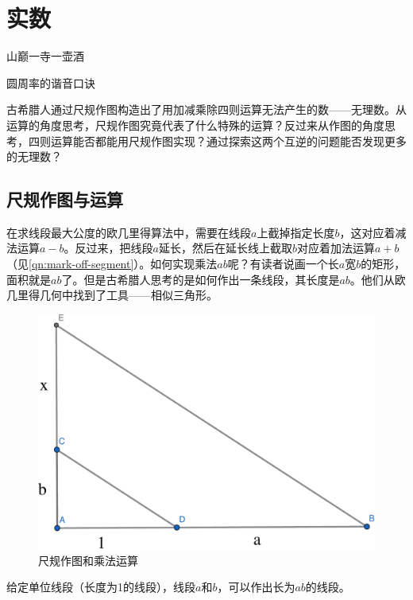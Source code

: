 \documentclass[b5paper]{ctexart}
\begin{document}
\chapter{实数}

\epigraph{山巅一寺一壶酒}{圆周率的谐音口诀}

古希腊人通过尺规作图构造出了用加减乘除四则运算无法产生的数——无理数。从运算的角度思考，尺规作图究竟代表了什么特殊的运算？反过来从作图的角度思考，四则运算能否都能用尺规作图实现？通过探索这两个互逆的问题能否发现更多的无理数？

\section{尺规作图与运算}
\label{sec:geometric-arthimetic}
在求线段最大公度的欧几里得算法中，需要在线段$a$上截掉指定长度$b$，这对应着减法运算$a - b$。反过来，把线段$a$延长，然后在延长线上截取$b$对应着加法运算$a + b$（见\cref{qn:mark-off-segment}）。如何实现乘法$ab$呢？有读者说画一个长$a$宽$b$的矩形，面积就是$ab$了。但是古希腊人思考的是如何作出一条线段，其长度是$ab$。他们从欧几里得几何中找到了工具——相似三角形。

\begin{figure}[htbp]
 \centering
 \includegraphics[scale=0.35]{img/product}
 \caption{尺规作图和乘法运算}
 \label{fig:product}
\end{figure}

\begin{proposition}
给定单位线段（长度为1的线段），线段$a$和$b$，可以作出长为$ab$的线段。
\end{proposition}
\end{document}
